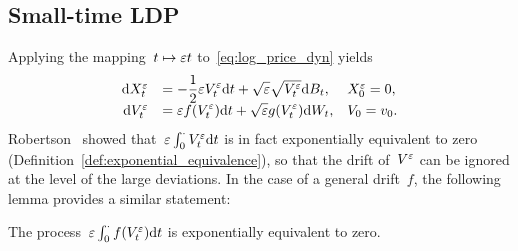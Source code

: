\subsection{Small-time LDP}\label{sec:SmallTimeLDP}
Applying the mapping~$t\mapsto \varepsilon t$ to~\eqref{eq:log_price_dyn} yields
\begin{equation}\label{eq:log_price_dynSmallTime}
\begin{array}{rll}
\mathrm{d} X_t^\varepsilon & = \displaystyle  -\frac{1}{2}\varepsilon V_t^\varepsilon \mathrm{d} t + \sqrt{\varepsilon}\sqrt{V_t^\varepsilon} \mathrm{d} B_t,
 & X_0^\varepsilon = 0,\\
\mathrm{d} V_t^\varepsilon & = \displaystyle \varepsilon f(V_t^\varepsilon)\mathrm{d} t + \sqrt{\varepsilon}g(V_t^\varepsilon) \mathrm{d} W_t, & V_0 = v_0.
\end{array}
\end{equation}
Robertson~\cite[Proposition~3.2]{Robertson2010SampleModels} showed that~$\varepsilon\int_0^\cdot V_t^\varepsilon \mathrm{d} t$ is in fact exponentially equivalent to zero (Definition~\ref{def:exponential_equivalence}),
so that the drift of~$V^\varepsilon$ can be ignored at the level of the large deviations. 
In the case of a general drift~$f$, the following lemma provides a similar statement:
\begin{lemma}
The process~$\varepsilon\int_0^\cdot f(V_t^\varepsilon) \mathrm{d} t$ is exponentially equivalent to zero.
\end{lemma}
